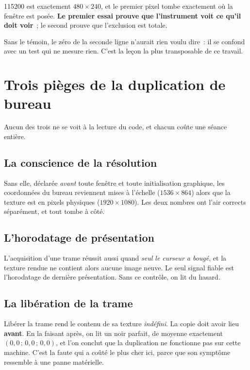 \documentclass[11pt,a4paper]{article}
\newcommand{\np}[1]{#1}
\begin{document}
\np{115200} est exactement $480 \times 240$, et le premier pixel tombe
exactement où la fenêtre est posée. \textbf{Le premier essai prouve que
l'instrument voit ce qu'il doit voir}~; le second prouve que l'exclusion est
totale.

Sans le témoin, le zéro de la seconde ligne n'aurait rien voulu dire~: il se
confond avec un test qui ne mesure rien. C'est la leçon la plus transposable
de ce travail.

\section{Trois pièges de la duplication de bureau}

Aucun des trois ne se voit à la lecture du code, et chacun coûte une séance
entière.

\subsection{La conscience de la résolution}

Sans elle, déclarée \emph{avant} toute fenêtre et toute initialisation
graphique, les coordonnées du bureau reviennent mises à l'échelle
($1536 \times 864$) alors que la texture est en pixels physiques
($1920 \times 1080$). Les deux nombres ont l'air corrects séparément, et tout
tombe à côté.

\subsection{L'horodatage de présentation}

L'acquisition d'une trame réussit aussi quand \emph{seul le curseur a bougé},
et la texture rendue ne contient alors aucune image neuve. Le seul signal
fiable est l'horodatage de dernière présentation. Sans ce contrôle, on lit du
hasard.

\subsection{La libération de la trame}
\label{sec:release}

Libérer la trame rend le contenu de sa texture \emph{indéfini}. La copie doit
avoir lieu \textbf{avant}. En la faisant après, on lit un noir parfait, de
moyenne exactement $(0{,}0\,;\,0{,}0\,;\,0{,}0)$, et l'on conclut que la
duplication ne fonctionne pas sur cette machine. C'est la faute qui a coûté le
plus cher ici, parce que son symptôme ressemble à une panne matérielle.
\end{document}
